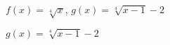 {$f(x) = \sqrt[4]{x}$, $g(x) = \sqrt[4]{x-1}-2$}
{$g(x) = \sqrt[4]{x-1}-2$\\
\begin{center}
\end{center}}


